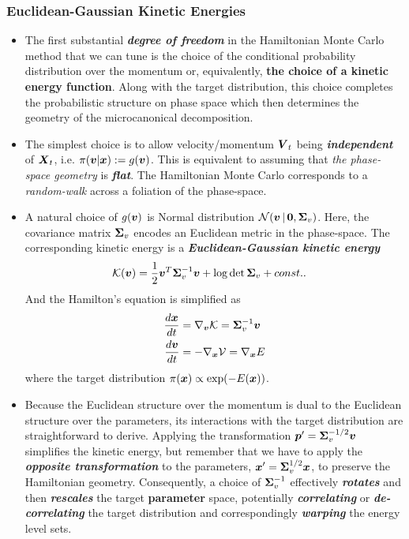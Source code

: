 \documentclass[11pt]{article}
\begin{document}
\subsubsection{Euclidean-Gaussian Kinetic Energies}
\begin{itemize}
\item The first substantial \textbf{\emph{degree of freedom}} in the Hamiltonian Monte Carlo method that we can tune is the choice of the conditional probability distribution over the momentum or, equivalently, \textbf{the choice of a kinetic energy function}. Along with the target distribution, this choice completes the probabilistic structure on phase space which then determines the geometry of the microcanonical decomposition.

\item The simplest choice is to allow velocity/momentum $\boldsymbol{V}_{t}$ being \textbf{\emph{independent}} of $\boldsymbol{X}_{t}$, i.e. $\pi(\boldsymbol{v}|\boldsymbol{x}):= g(\boldsymbol{v})$. This is equivalent to assuming that \emph{the phase-space geometry} is \emph{\textbf{flat}}. The Hamiltonian Monte Carlo corresponds to a \emph{random-walk} across a foliation of the phase-space.

\item A natural choice of $g(\boldsymbol{v})$ is Normal distribution ${\mathcal N}(\boldsymbol{v}\,|\, \boldsymbol{0}, \boldsymbol{\Sigma}_{v})$. Here, the covariance matrix $\boldsymbol{\Sigma}_{v}$ encodes an Euclidean metric in the phase-space. The corresponding kinetic energy is a \emph{\textbf{Euclidean-Gaussian kinetic energy}}
\begin{align}
{\mathcal K}(\boldsymbol{v}) &= \frac{1}{2}\boldsymbol{v}^{T} \boldsymbol{\Sigma}_{v}^{-1} \boldsymbol{v} + \log \det{\boldsymbol{\Sigma}_{v}} + const.. \label{eqn: hmc_quatratic_kinetic}
\end{align}   And the Hamilton's equation is simplified as 
\begin{align}
\frac{d \boldsymbol{x}}{dt} &= \nabla_{\boldsymbol{v}}{{\mathcal K}} = \boldsymbol{\Sigma}_{v}^{-1} \boldsymbol{v}  \nonumber\\
\frac{d \boldsymbol{v}}{dt} &= - \nabla_{\boldsymbol{x}}{{\mathcal V}} = \nabla_{\boldsymbol{x}}{E} \label{eqn: hmc_hamiltonian_eqn_quar_k}
\end{align} where the target distribution $\pi(\boldsymbol{x}) \propto \exp(-E(\boldsymbol{x}))$.

\item Because the Euclidean structure over the momentum is dual to the Euclidean structure over the parameters, its interactions with the target distribution are straightforward to derive. Applying the transformation $\boldsymbol{p}' = \boldsymbol{\Sigma}_v^{-1/2}\boldsymbol{v}$ simplifies the kinetic energy, but remember that we have to apply the \emph{\textbf{opposite transformation}} to the parameters, $\boldsymbol{x}' = \boldsymbol{\Sigma}_v^{1/2}\boldsymbol{x}$, to preserve the Hamiltonian geometry.  Consequently, a choice of $\boldsymbol{\Sigma}_{v}^{-1}$ effectively \emph{\textbf{rotates}} and then \emph{\textbf{rescales}} the target \textbf{parameter} space, potentially \emph{\textbf{correlating}} or \textbf{\emph{de-correlating}} the target distribution and correspondingly \emph{\textbf{warping}} the energy level sets.


\end{itemize}
\end{document}
